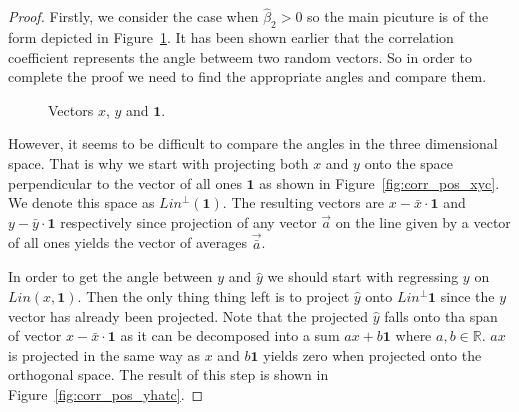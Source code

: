 \documentclass[nobib]{tufte-handout}
\theoremstyle{definition}
\begin{document}
\begin{proof}
Firstly, we consider the case when $\hat \beta_2 > 0$ so the main picuture is of the form depicted in Figure~\ref{fig:corr_pos_base}.
It has been shown earlier that the correlation coefficient represents the angle betweem two random vectors.
So in order to complete the proof we need to find the appropriate angles and compare them.

\begin{figure}[h!]
\caption{Vectors $x$, $y$ and $\mathbf{1}$.}
\label{fig:corr_pos_base}
\end{figure}

However, it seems to be difficult to compare the angles in the three dimensional space.
That is why we start with projecting both $x$ and $y$ onto the space perpendicular to the vector of all ones $\mathbf{1}$ as shown in Figure~\ref{fig:corr_pos_xyc}.
We denote this space as $Lin^{\perp}(\mathbf{1})$. The resulting vectors are $x - \bar x \cdot \mathbf{1}$  and $y - \bar y \cdot \mathbf{1}$ respectively
since projection of any vector $\vec{a}$ on the line given by a vector of all ones yields the vector of averages $\vec{\bar a}$.

In order to get the angle between $y$ and $\hat y$ we should start with regressing $y$ on $Lin(x, \mathbf{1})$.
Then the only thing thing left is to project $\hat y$ onto $Lin^{\perp}\mathbf{1}$ since the $y$ vector has already been projected.
Note that the projected $\hat y$ falls onto tha span of vector $x - \bar x \cdot \mathbf{1}$ as it can be decomposed into a sum $a x + b \mathbf{1}$ where $a, b \in \mathbb{R}$.
$a x$ is projected in the same way as $x$ and $b \mathbf{1}$ yields zero when projected onto the orthogonal space.
The result of this step is shown in Figure~\ref{fig:corr_pos_yhatc}.


\end{proof}
\end{document}
